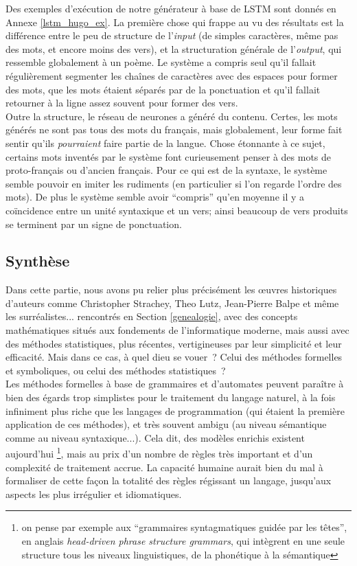 \documentclass{article}
\begin{document}
					Des exemples d'exécution de notre générateur à base de LSTM sont donnés en Annexe \ref{lstm_hugo_ex}. La première chose qui frappe au vu des résultats est la différence entre le peu de structure de l'\textit{input} (de simples caractères, même pas des mots, et encore moins des vers), et la structuration générale de l'\textit{output}, qui ressemble globalement à un poème. Le système a compris seul qu'il fallait régulièrement segmenter les chaînes de caractères avec des espaces pour former des mots, que les mots étaient séparés par de la ponctuation et qu'il fallait retourner à la ligne assez souvent pour former des vers.\\
					
					Outre la structure, le réseau de neurones a généré du contenu. Certes, les mots générés ne sont pas tous des mots du français, mais globalement, leur forme fait sentir qu'ils \textit{pourraient} faire partie de la langue. Chose étonnante à ce sujet, certains mots inventés par le système font curieusement penser à des mots de proto-français ou d'ancien français. Pour ce qui est de la syntaxe, le système semble pouvoir en imiter les rudiments (en particulier si l'on regarde l'ordre des mots). De plus le système semble avoir ``compris'' qu'en moyenne il y a coïncidence entre un unité syntaxique et un vers; ainsi beaucoup de vers produits se terminent par un signe de ponctuation.

			
		\subsection{Synthèse}
			Dans cette partie, nous avons pu relier plus précisément les œuvres historiques d'auteurs comme Christopher Strachey, Theo Lutz, Jean-Pierre Balpe et même les surréalistes... rencontrés en Section \ref{genealogie}, avec des concepts mathématiques situés aux fondements de l'informatique moderne, mais aussi avec des méthodes statistiques, plus récentes, vertigineuses par leur simplicité et leur efficacité. Mais dans ce cas, à quel dieu se vouer~? Celui des méthodes formelles et symboliques, ou celui des méthodes statistiques~?\\
				
			Les méthodes formelles à base de grammaires et d'automates peuvent paraître à bien des égards trop simplistes pour le traitement du langage naturel, à la fois infiniment plus riche que les langages de programmation (qui étaient la première application de ces méthodes), et très souvent ambigu (au niveau sémantique comme au niveau syntaxique...). Cela dit, des modèles enrichis existent aujourd'hui \footnote{on pense par exemple aux ``grammaires syntagmatiques guidée par les têtes'', en anglais \textit{head-driven phrase structure grammars}, qui intègrent en une seule structure tous les niveaux linguistiques, de la phonétique à la sémantique}, mais au prix d'un nombre de règles très important et d'un complexité de traitement accrue. La capacité humaine aurait bien du mal à formaliser de cette façon la totalité des règles régissant un langage, jusqu'aux aspects les plus irrégulier et idiomatiques.
			
\end{document}

